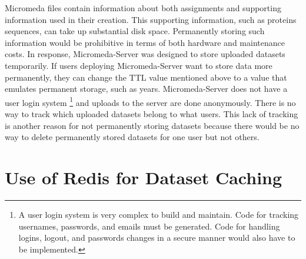 Micromeda files contain information about both assignments and supporting information used in their creation. This supporting information, such as proteins sequences, can take up substantial disk space. Permanently storing such information would be prohibitive in terms of both hardware and maintenance costs. In response, Micromeda-Server was designed to store uploaded datasets temporarily. If users deploying Micromeda-Server want to store data more permanently, they can change the TTL value mentioned above to a value that emulates permanent storage, such as years. Micromeda-Server does not have a user login system \footnote{A user login system is very complex to build and maintain. Code for tracking usernames, passwords, and emails must be generated. Code for handling logins, logout, and passwords changes in a secure manner would also have to be implemented.} and uploads to the server are done anonymously. There is no way to track which uploaded datasets belong to what users. This lack of tracking is another reason for not permanently storing datasets because there would be no way to delete permanently stored datasets for one user but not others.

\section{Use of Redis for Dataset Caching} \label{redis-caching}

